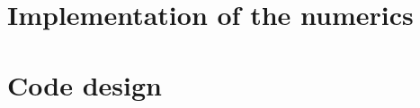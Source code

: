 \documentclass[a4paper, 11pt]{report}
\begin{document}
\chapter{Implementation of the numerics}









\clearpage

\appendix

\chapter{Code design}



\clearpage

% 



\clearpage

\printbibliography
\end{document}
